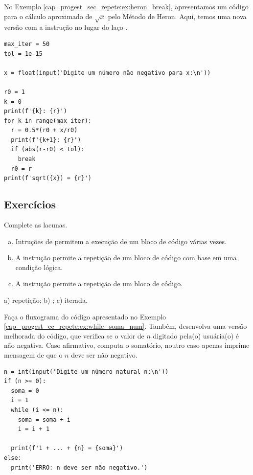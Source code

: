 \begin{ex}
  No Exemplo \ref{cap_progest_sec_repete:ex:heron_break}, apresentamos um código para o cálculo aproximado de $\sqrt{x}$ pelo Método de Heron. Aqui, temos uma nova versão com a instrução {\PYTHONfor} no lugar do laço {\PYTHONwhile}.

\begin{lstlisting}
max_iter = 50
tol = 1e-15

x = float(input('Digite um número não negativo para x:\n'))

r0 = 1
k = 0
print(f'{k}: {r}')
for k in range(max_iter):
  r = 0.5*(r0 + x/r0)
  print(f'{k+1}: {r}')
  if (abs(r-r0) < tol):
    break
  r0 = r
print(f'sqrt({x}) = {r}')
\end{lstlisting}

\end{ex}

\subsection{Exercícios}


\begin{exer}
  Complete as lacunas.
  \begin{enumerate}[a)]
    \item Intruções de \underline{\phantom{repetição}} permitem a execução de um bloco de código várias vezes.
    \item A instrução \underline{\phantom{{\PYTHONwhile}}} permite a repetição de um bloco de código com base em uma condição lógica.
    \item A instrução {\PYTHONfor} permite a repetição \underline{\phantom{iterada}} de um bloco de código.
  \end{enumerate}
\end{exer}
\begin{resp}
  a) repetição; b) {\PYTHONwhile}; c) iterada.
\end{resp}


\begin{exer}
  Faça o fluxograma do código apresentado no Exemplo \ref{cap_progest_ec_repete:ex:while_soma_num}. Também, desenvolva uma versão melhorada do código, que verifica se o valor de $n$ digitado pela(o) usuária(o) é não negativa. Caso afirmativo, computa o somatório, noutro caso apenas imprime mensagem de que o $n$ deve ser não negativo.
\end{exer}
\begin{resp}

\begin{lstlisting}
n = int(input('Digite um número natural n:\n'))
if (n >= 0):
  soma = 0
  i = 1
  while (i <= n):
    soma = soma + i
    i = i + 1

  print(f'1 + ... + {n} = {soma}')
else:
  print('ERRO: n deve ser não negativo.')
\end{lstlisting}

\end{resp}

